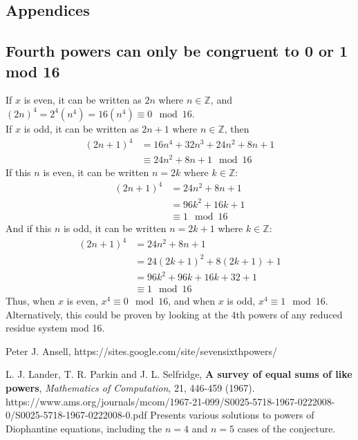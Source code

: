 \documentclass{article}
\begin{document}
\begin{flushleft}
\newpage

\section{Appendices}
\subsection{Fourth powers can only be congruent to 0 or 1 mod 16}
If $x$ is even, it can be written as $2n$ where $n \in \mathbb{Z}$, and $(2n)^4=2^4(n^4)=16(n^4) \equiv 0 \mod 16$. \\
If $x$ is odd, it can be written as $2n+1$ where $n \in \mathbb{Z}$, then 
\begin{align*}
    (2n+1)^4 &= 16n^4 + 32n^3 + 24n^2 + 8n + 1 \\
    &\equiv 24n^2+8n+1 \mod 16
\end{align*}
If this $n$ is even, it can be written $n=2k$ where $k \in \mathbb{Z}$:
\begin{align*}
    (2n+1)^4 &= 24n^2+8n+1 \\
    &= 96k^2 + 16k + 1 \\
    &\equiv 1 \mod 16
\end{align*}
And if this $n$ is odd, it can be written  $n=2k+1$ where $k \in \mathbb{Z}$: 
\begin{align*}
    (2n+1)^4 &= 24n^2 + 8n + 1 \\
    &= 24(2k+1)^2 + 8(2k+1) + 1 \\
    &= 96k^2 + 96k + 16k + 32 + 1\\
    &\equiv 1 \mod 16
\end{align*}
Thus, when $x$ is even, $x^4 \equiv 0 \mod 16$, and when $x$ is odd, $x^4 \equiv 1 \mod 16$. \\
Alternatively, this could be proven by looking at the 4th powers of any reduced residue system mod 16. 




\begin{thebibliography}{9}

Peter J. Ansell, https://sites.google.com/site/sevensixthpowers/

L. J. Lander, T. R. Parkin and J. L. Selfridge,
       {\bf A survey of equal sums of like powers}, 
        \textit{Mathematics of Computation}, 21, 446-459 (1967). 
        https://www.ams.org/journals/mcom/1967-21-099/S0025-5718-1967-0222008-0/S0025-5718-1967-0222008-0.pdf 
        \subitem Presents various solutions to powers of Diophantine equations, including the $n=4$ and $n=5$ cases of the conjecture. 


\end{thebibliography}
\end{flushleft}
\end{document}
